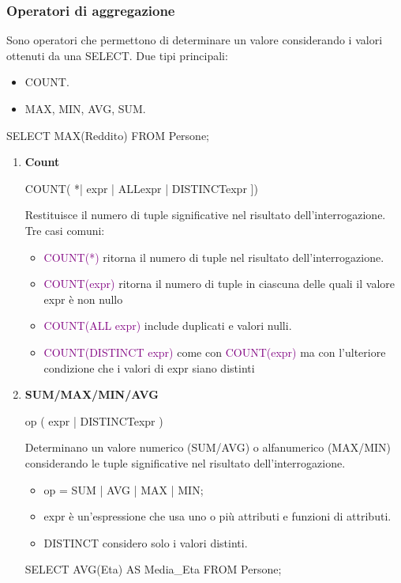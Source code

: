 \subsubsection{Operatori di aggregazione}


Sono operatori che permettono di determinare un valore considerando i valori 
ottenuti da una SELECT.
Due tipi principali:
\begin{itemize}
  \item COUNT.
  \item MAX, MIN, AVG, SUM.
\end{itemize}

\begin{codiceSQL}
SELECT MAX(Reddito) 
FROM Persone;
\end{codiceSQL}




  \begin{enumerate}
    \item \textbf{Count}
    \begin{codiceSQL}
      COUNT({ *| expr | ALLexpr | DISTINCTexpr }])
    \end{codiceSQL}
    Restituisce il numero di tuple significative nel risultato dell’interrogazione.
    Tre casi comuni:\begin{itemize}
      \item \textcolor{purple}{COUNT(*)} ritorna il numero di tuple nel risultato dell’interrogazione.
      \item \textcolor{purple}{COUNT(expr)} ritorna il numero di tuple in ciascuna delle quali il valore expr è non nullo
      \item \textcolor{purple}{COUNT(ALL expr)} include duplicati e valori nulli.
      \item \textcolor{purple}{COUNT(DISTINCT expr)} come con \textcolor{purple}{COUNT(expr)} ma con l’ulteriore condizione che i valori di expr siano distinti
    \end{itemize}
    \item \textbf{SUM/MAX/MIN/AVG} 
    \begin{codiceSQL}
      op ({ expr | DISTINCTexpr })
    \end{codiceSQL}
    Determinano un valore numerico (SUM/AVG) o alfanumerico (MAX/MIN) considerando le tuple significative nel risultato dell’interrogazione.
    \begin{itemize}
      \item op = SUM | AVG | MAX | MIN;
      \item expr è un’espressione che usa uno o più attributi e funzioni di attributi.
      \item DISTINCT considero solo i valori distinti.  
    \end{itemize}
    \begin{codiceSQL}
      SELECT AVG(Eta) AS Media\_Eta
      FROM Persone;
    \end{codiceSQL}
  \end{enumerate}


